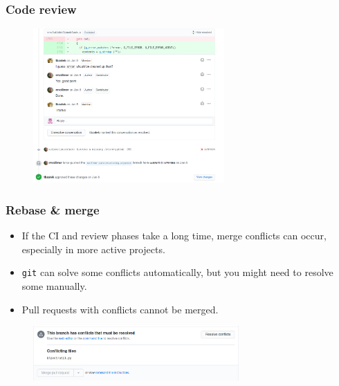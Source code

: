\documentclass[aspectratio=169]{beamer}              %
\begin{document}
\begin{frame}
	\frametitle{Code review}
	
\begin{figure}[ht!]
	\begin{center}
  	  \includegraphics[width=0.65\textwidth]{img/gh-review.png}
	\end{center}
\end{figure}
	
\end{frame}

\begin{frame}
	\frametitle{Rebase \& merge}
	
\begin{block}{}
		\begin{itemize}
			\item If the CI and review phases take a long time, merge conflicts can occur, especially in more active projects.
			\item \texttt{git} can solve some conflicts automatically, but you might need to resolve some manually.
			\item Pull requests with conflicts cannot be merged.
		\end{itemize}
\end{block}

\begin{figure}[ht!]
	\begin{center}
  	  \includegraphics[width=0.7\textwidth]{img/gh-merge-conflict.png}
	\end{center}
\end{figure}

\end{frame}
\end{document}
